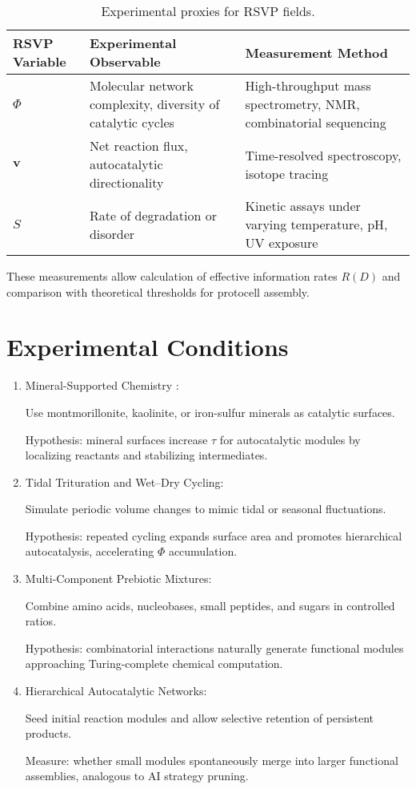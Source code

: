 \documentclass{book}
\begin{document}
\begin{table}[h]
\centering
\begin{tabular}{lll}
\toprule
RSVP Variable & Experimental Observable & Measurement Method \\
\midrule
$\Phi$ & Molecular network complexity, diversity of catalytic cycles & High-throughput mass spectrometry, NMR, combinatorial sequencing \\
$\mathbf{v}$ & Net reaction flux, autocatalytic directionality & Time-resolved spectroscopy, isotope tracing \\
$S$ & Rate of degradation or disorder & Kinetic assays under varying temperature, pH, UV exposure \\
\bottomrule
\end{tabular}
\caption{Experimental proxies for RSVP fields.}
\end{table}

These measurements allow calculation of effective information rates $R(D)$ and comparison with theoretical thresholds for protocell assembly.

\section{Experimental Conditions}
\begin{enumerate}
\item Mineral-Supported Chemistry \citep{hazen2005}:

Use montmorillonite, kaolinite, or iron-sulfur minerals as catalytic surfaces.

Hypothesis: mineral surfaces increase $\tau$ for autocatalytic modules by localizing reactants and stabilizing intermediates.

\item Tidal Trituration and Wet–Dry Cycling:

Simulate periodic volume changes to mimic tidal or seasonal fluctuations.

Hypothesis: repeated cycling expands surface area and promotes hierarchical autocatalysis, accelerating $\Phi$ accumulation.

\item Multi-Component Prebiotic Mixtures:

Combine amino acids, nucleobases, small peptides, and sugars in controlled ratios.

Hypothesis: combinatorial interactions naturally generate functional modules approaching Turing-complete chemical computation.

\item Hierarchical Autocatalytic Networks:

Seed initial reaction modules and allow selective retention of persistent products.

Measure: whether small modules spontaneously merge into larger functional assemblies, analogous to AI strategy pruning.
\end{enumerate}
\end{document}
